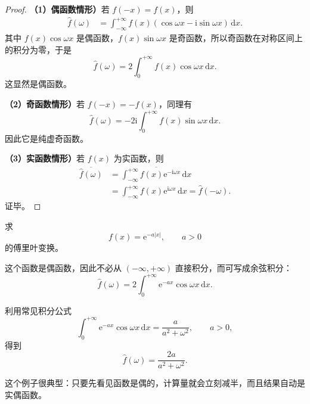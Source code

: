 \begin{proof}
\textbf{（1）偶函数情形）}若 $f(-x)=f(x)$，则
\begin{align}
    \hat{f}(\omega)
    &=
    \int_{-\infty}^{+\infty}
    f(x)\left(\cos \omega x-\mathrm{i}\sin \omega x\right)\,\mathrm{d}x.
\end{align}
其中 $f(x)\cos \omega x$ 是偶函数，$f(x)\sin \omega x$ 是奇函数，所以奇函数在对称区间上的积分为零，于是
\begin{equation}
    \hat{f}(\omega)=2\int_{0}^{+\infty} f(x)\cos \omega x\,\mathrm{d}x.
\end{equation}
这显然是偶函数。

\textbf{（2）奇函数情形）}若 $f(-x)=-f(x)$，同理有
\begin{equation}
    \hat{f}(\omega)
    =
    -2\mathrm{i}\int_{0}^{+\infty} f(x)\sin \omega x\,\mathrm{d}x.
\end{equation}
因此它是纯虚奇函数。

\textbf{（3）实函数情形）}若 $f(x)$ 为实函数，则
\begin{align}
    \overline{\hat{f}(\omega)}
    &=
    \overline{
        \int_{-\infty}^{+\infty}
        f(x)\mathrm{e}^{-\mathrm{i}\omega x}\,\mathrm{d}x
    } \\
    &=
    \int_{-\infty}^{+\infty}
    f(x)\mathrm{e}^{\mathrm{i}\omega x}\,\mathrm{d}x
    =
    \hat{f}(-\omega).
\end{align}
证毕。
\end{proof}

\begin{lizi}{}{}
求
\begin{equation}
    f(x)=\mathrm{e}^{-a|x|}, \qquad a>0
\end{equation}
的傅里叶变换。

\begin{jie}
这个函数是偶函数，因此不必从 $(-\infty,+\infty)$ 直接积分，而可写成余弦积分：
\begin{equation}
    \hat{f}(\omega)
    =
    2\int_{0}^{+\infty}\mathrm{e}^{-ax}\cos \omega x\,\mathrm{d}x.
\end{equation}

利用常见积分公式
\[
    \int_0^{+\infty}\mathrm{e}^{-ax}\cos \omega x\,\mathrm{d}x
    =
    \frac{a}{a^2+\omega^2},
    \qquad a>0,
\]
得到
\begin{equation}
    \boxed{
        \hat{f}(\omega)=\frac{2a}{a^2+\omega^2}
    }.
\end{equation}

这个例子很典型：只要先看见函数是偶的，计算量就会立刻减半，而且结果自动是实偶函数。
\end{jie}
\end{lizi}

